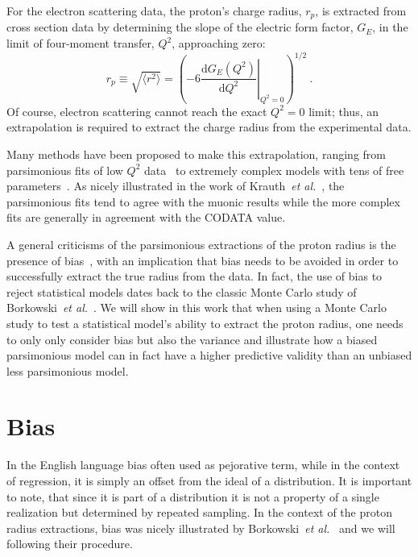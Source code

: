 \documentclass[10pt,aps,prc,twocolumn]{revtex4-1}
\begin{document}
For the electron scattering data, the proton's charge radius, $r_p$, is extracted from
cross section data by determining the slope of the electric form factor, $G_E$, in the
limit of four-moment transfer, $Q^2$, approaching zero: 
$$
  r_p \equiv \sqrt{ \langle r^2 \rangle}
   = \left( -6  \left. \frac{\mathrm{d} G_E(Q^2)}{\mathrm{d}Q^2}
    \right|_{Q^{2}=0} \right)^{1/2} \>.
$$
Of course, electron scattering cannot reach the exact $Q^2 = 0$ limit; thus,
an extrapolation is required to extract the charge radius from the experimental data.

Many methods have been proposed to make this extrapolation,
ranging from parsimonious fits of low $Q^2$ data~\cite{Griffioen:2015hta,Horbatsch:2016ilr,Higinbotham:2015rja} 
to extremely complex models with tens of free parameters~\cite{Bernauer:2013tpr,Lee:2015jqa}.   
As nicely illustrated in the work of Krauth~{\it{et al.}}~\cite{Krauth:2017ijq}, the 
parsimonious fits tend to agree with the muonic results while the more complex fits 
are generally in agreement with the CODATA value.

A general criticisms of the parsimonious extractions of the proton radius is the presence of bias~\cite{Sick:2017aor},
with an implication that bias needs to be avoided in order to successfully extract the true radius from the data.
In fact, the use of bias to reject statistical models dates back to the classic Monte Carlo study of Borkowski~{\it{et al.}}~\cite{Borkowski:1975}. 
We will show in this work that when using a Monte Carlo study to test a statistical model's ability
to extract the proton radius, one needs to only only consider bias but also the variance and
illustrate how a biased parsimonious model can in fact have a higher predictive validity than an 
unbiased less parsimonious model.

\section{Bias}

In the English language bias often used as pejorative term, while in the context of regression, it is simply
an offset from the ideal of a distribution.   It is important to note, that since it is part of a distribution it
is not a property of a single realization but determined by repeated sampling.    In the context of the proton 
radius extractions, bias was nicely illustrated by Borkowski~{\it{et al.}}~\cite{Borkowski:1975} and we will
following their procedure.
\end{document}
